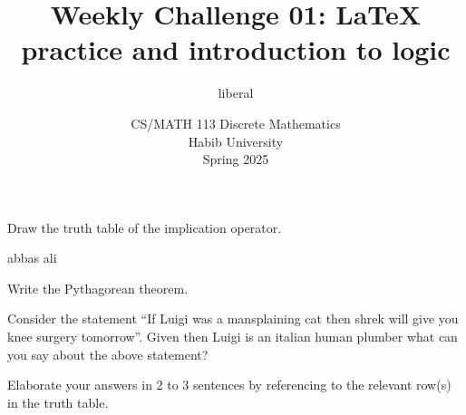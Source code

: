 \documentclass[a4paper]{exam}
\title{Weekly Challenge 01: \LaTeX\; practice and introduction to logic}
\author{liberal} %
\date{CS/MATH 113 Discrete Mathematics\\Habib University\\Spring 2025}
\begin{document}
\maketitle

\begin{questions}
  
 Draw the truth table of the implication operator.
\begin{solution}
    abbas ali
\end{solution}

 Write the Pythagorean theorem.
\begin{solution}
\end{solution}

 Consider the statement ``If Luigi was a mansplaining cat then shrek will give you knee surgery tomorrow''. Given then Luigi is an italian human plumber what can you say about the above statement?

Elaborate your answers in 2 to 3 sentences by referencing to the relevant row(s) in the truth table.
\begin{solution}
\end{solution}


      
\end{questions}
\end{document}
